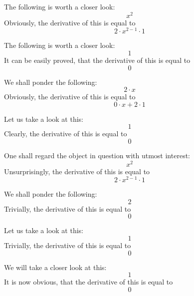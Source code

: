 \documentclass{article}
\begin{document}
The following is worth a closer look:
\begin{equation}
x ^{2 } 
\end{equation}
Obviously, the derivative of this is equal to
\begin{equation}
2 \cdot x ^{2 - 1 } \cdot 1 
\end{equation}

The following is worth a closer look:
\begin{equation}
1 
\end{equation}
It can be easily proved, that the derivative of this is equal to
\begin{equation}
0 
\end{equation}

We shall ponder the following:
\begin{equation}
2 \cdot x 
\end{equation}
Obviously, the derivative of this is equal to
\begin{equation}
0 \cdot x + 2 \cdot 1 
\end{equation}

Let us take a look at this:
\begin{equation}
1 
\end{equation}
Clearly, the derivative of this is equal to
\begin{equation}
0 
\end{equation}

One shall regard the object in question with utmost interest:
\begin{equation}
x ^{2 } 
\end{equation}
Unsurprisingly, the derivative of this is equal to
\begin{equation}
2 \cdot x ^{2 - 1 } \cdot 1 
\end{equation}

We shall ponder the following:
\begin{equation}
2 
\end{equation}
Trivially, the derivative of this is equal to
\begin{equation}
0 
\end{equation}

Let us take a look at this:
\begin{equation}
1 
\end{equation}
Trivially, the derivative of this is equal to
\begin{equation}
0 
\end{equation}

We will take a closer look at this:
\begin{equation}
1 
\end{equation}
It is now obvious, that the derivative of this is equal to
\begin{equation}
0 
\end{equation}
\end{document}
